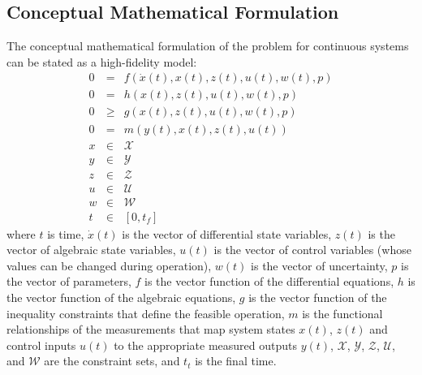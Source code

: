 \documentclass[oneside,11pt,a4paper]{article}
\begin{document}
\subsection{Conceptual Mathematical Formulation}
The conceptual mathematical formulation of the problem for continuous systems can be stated as a high-fidelity model:
\begin{subequations}\label{eq:model-high-fidelity}
    \begin{eqnarray}
        0 &=& f(\dot{x}(t),x(t), z(t), u(t), w(t), p) \\
        0 &=& h(x(t), z(t), u(t), w(t), p)\\
        0 &\geq& g(x(t), z(t), u(t), w(t), p)\\
        0 &=& m(y(t), x(t), z(t), u(t))\\
        x &\in& \mathcal{X}\\
        y &\in& \mathcal{Y}\\
        z &\in& \mathcal{Z}\\
        u &\in& \mathcal{U}\\
        w &\in& \mathcal{W}\\
        t &\in& [0, t_{f}]
    \end{eqnarray}
\end{subequations}
where $t$ is time, $\dot{x}(t)$ is the vector of differential state variables, $z(t)$ is the vector of algebraic state variables, $u(t)$ is the vector of control variables (whose values can be changed during operation), $w(t)$ is the vector of uncertainty, $p$ is the vector of parameters, $f$ is the vector function of the differential equations, $h$ is the vector function of the algebraic equations, $g$ is the vector function of the inequality constraints that define the feasible operation, $m$ is the functional relationships of the measurements that map system states $x(t)$, $z(t)$ and control inputs $u(t)$ to the appropriate measured outputs $y(t)$, $\mathcal{X}$, $\mathcal{Y}$, $\mathcal{Z}$, $\mathcal{U}$, and $\mathcal{W}$ are the constraint sets, and $t_{t}$ is the final time.
\end{document}
